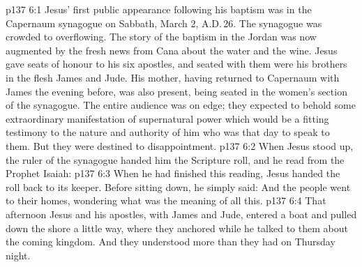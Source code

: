 \vs p137 6:1 Jesus’ first public appearance following his baptism was in the Capernaum synagogue on Sabbath, March 2, A.D.\,26. The synagogue was crowded to overflowing. The story of the baptism in the Jordan was now augmented by the fresh news from Cana about the water and the wine. Jesus gave seats of honour to his six apostles, and seated with them were his brothers in the flesh James and Jude. His mother, having returned to Capernaum with James the evening before, was also present, being seated in the women’s section of the synagogue. The entire audience was on edge; they expected to behold some extraordinary manifestation of supernatural power which would be a fitting testimony to the nature and authority of him who was that day to speak to them. But they were destined to disappointment.
\vs p137 6:2 When Jesus stood up, the ruler of the synagogue handed him the Scripture roll, and he read from the Prophet Isaiah: 
\vs p137 6:3 When he had finished this reading, Jesus handed the roll back to its keeper. Before sitting down, he simply said:  And the people went to their homes, wondering what was the meaning of all this.
\vs p137 6:4 \pc That afternoon Jesus and his apostles, with James and Jude, entered a boat and pulled down the shore a little way, where they anchored while he talked to them about the coming kingdom. And they understood more than they had on Thursday night.
